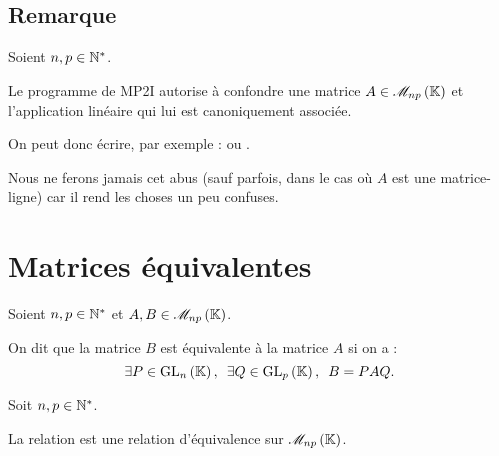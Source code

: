 \subsection{Remarque}

\begin{abus}
Soient \(n,p\in\mathbb{N}^*\).

Le programme de MP2I autorise à confondre une matrice \(A\in\M{np}\) et l'application linéaire qui lui est canoniquement associée.

On peut donc écrire, par exemple :  ou .

Nous ne ferons jamais cet abus (sauf parfois, dans le cas où \(A\) est une matrice-ligne) car il rend les choses un peu confuses.
\end{abus}

\section{Matrices équivalentes}

\begin{defi}
Soient \(n,p\in\mathbb{N}^*\) et \(A,B\in\M{np}\).

On dit que la matrice \(B\) est équivalente à la matrice \(A\) si on a : \[\quantifs{\exists P\in\GL{n};\exists Q\in\GL{p}}B=PAQ.\]
\end{defi}

\begin{prop}
Soit \(n,p\in\mathbb{N}^*\).

La relation  est une relation d'équivalence sur \(\M{np}\).
\end{prop}


